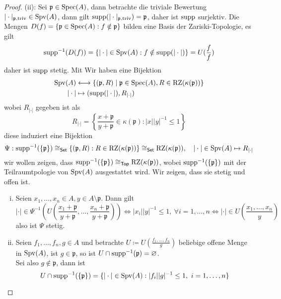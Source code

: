 \begin{proof}
    (ii): Sei $\mathfrak{p}\in \operatorname{Spec}(A)$, dann betrachte die triviale Bewertung $\vert\cdot\vert_{\mathfrak{p},\text{triv}}\in \operatorname{Spv}(A)$, dann gilt $\operatorname{supp}(\vert\cdot\vert_{\mathfrak{p},\text{triv}})=\mathfrak{p}$, daher ist $\operatorname{supp}$ surjektiv.  
    Die Mengen $D(f)=\{\mathfrak{p}\in \operatorname{Spec}(A) : f\notin \mathfrak{p}\}$ bilden eine Basis der Zariski-Topologie, es gilt 
    \[
    \operatorname{supp}^{-1}(D(f)) = \{ \vert\cdot\vert\in \operatorname{Spv}(A) : f\notin \operatorname{supp}(\vert\cdot\vert) \} =U(\frac{f}{f})   
    \]
    daher ist $\operatorname{supp}$ stetig. Mit Wir haben eine Bijektion
    \begin{align*}
        \operatorname{Spv}(A) &\longleftrightarrow\{ (\mathfrak{p},R) \mid \mathfrak{p}\in \operatorname{Spec}(A), R\in \operatorname{RZ}(\kappa(\mathfrak{p}))\} \\
        \vert\cdot\vert &\mapsto (\operatorname{supp}(\vert\cdot\vert),R_{\vert\cdot\vert})
    \end{align*}
    wobei $R_{\vert\cdot\vert}$ gegeben ist als 
    \[
        R_{\vert\cdot\vert} = \left\{\frac{x+\mathfrak{p}}{y+\mathfrak{p}}\in \kappa(\mathfrak{p}) : \vert x\vert \vert y\vert^{-1}\le 1\right\}
    \]
    diese induziert eine Bijektion
    \[
    \Psi: \operatorname{supp}^{-1}(\{\mathfrak{p}\}) \cong_{\mathsf{Set}} \{ (\mathfrak{p},R) : R\in \operatorname{RZ}(\kappa(\mathfrak{p}))\} \cong_{\mathsf{Set}} \operatorname{RZ}(\kappa(\mathfrak{p})), \quad \vert\cdot\vert\in \operatorname{Spv}(A) \mapsto R_{\vert\cdot\vert}
    \]
    wir wollen zeigen, dass $\operatorname{supp}^{-1}(\{\mathfrak{p}\}) \cong_{\mathsf{Top}}\operatorname{RZ}(\kappa(\mathfrak{p}))$, wobei $\operatorname{supp}^{-1}(\{\mathfrak{p}\})$ mit der Teilraumtpologie von $\operatorname{Spv}(A)$ ausgestattet wird. Wir zeigen, dass sie stetig und offen ist.
    \begin{enumerate}[(i)]
        \item Seien $x_1,\ldots,x_n\in A, y\in  A \setminus \mathfrak{p}$. Dann gilt 
        \[
        \vert\cdot\vert\in \Psi^{-1}(U(\frac{x_1+\mathfrak{p}}{y+\mathfrak{p}},\ldots,\frac{x_n+\mathfrak{p}}{y+\mathfrak{p}})) \Leftrightarrow \vert x_i \vert \vert y\vert^{-1} \le 1,\ \forall i=1,\ldots,n \Leftrightarrow \vert\cdot\vert \in U(\frac{x_1,\ldots,x_n}{y})
        \]
        also ist $\Psi$ stetig. 
        \item Seien $f_1,\ldots,f_n,g \in A$ und betrachte $U\coloneqq U(\frac{f_1,\ldots,f_n}{g})$ beliebige offene Menge in $\operatorname{Spv}(A)$, ist $g\in \mathfrak{p}$, so ist $U\cap \operatorname{supp}^{-1}(\mathfrak{p})=\varnothing$. \\
        Sei also $g\notin \mathfrak{p}$, dann ist
        \[
        U \cap \operatorname{supp}^{-1}(\{ \mathfrak{p} \}) = \{ \vert\cdot\vert \in \operatorname{Spv}(A) : \vert f_i \vert \vert g\vert^{-1} \le 1,\ i=1,\ldots,n\}    
\]
\end{enumerate}
\end{proof}
